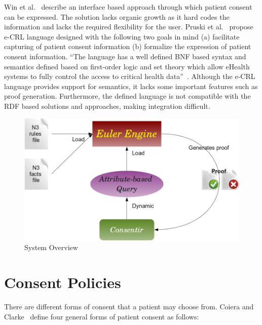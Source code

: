 \documentclass[conference]{IEEEtran}
\begin{document}
Win et al.~\cite{win2002implementing} describe an interface based approach through which patient consent can be expressed.  The solution lacks organic growth as
it hard codes the information and lacks the required flexibility for the user.
Pruski et al.~\cite{pruski2010} propose e-CRL language designed with the following two goals in mind (a) facilitate capturing of patient consent information (b)
formalize the expression of patient consent information.  ``The language has a well defined BNF based syntax and semantics defined based on first-order logic
and set theory which allow eHealth systems to fully control the access to critical health data''~\cite{pruski2010}.  Although the e-CRL language provides support for semantics,
it lacks some important features such as proof generation.  Furthermore, the defined language is not compatible with the RDF based solutions and approaches,
making integration difficult.

\begin{figure}[!t]
 \centering
 \includegraphics[scale=0.4,keepaspectratio=true]{./overview.png}
 \caption{System Overview}
 \label{fig:overview}
\end{figure}

\section{Consent Policies}
\label{cons-polic}


There are different forms of consent that a patient may choose from. Coiera and Clarke~\cite{coiera2004consent} define four general forms of patient consent as
follows:
\end{document}
